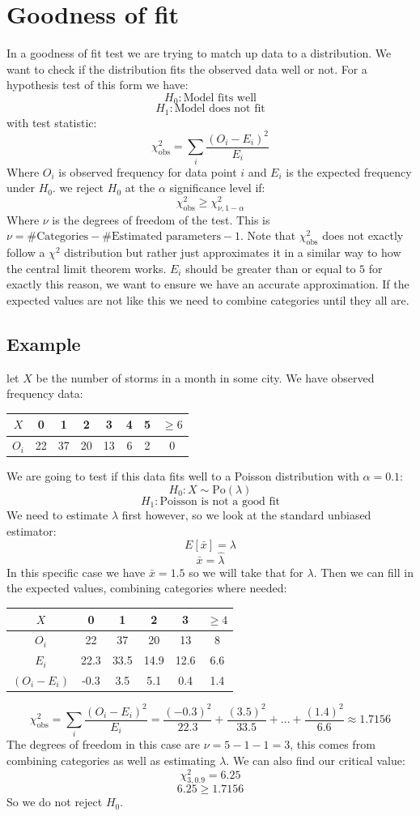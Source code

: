 \documentclass[12pt]{article}
\newcommand{\chisq}{\chi^2_{\text{obs}}}
\begin{document}
\section{Goodness of fit}
In a goodness of fit test we are trying to match up data to a distribution. We want to check if the distribution fits the observed data well or not. For a hypothesis test of this form we have:
\[H_0: \text{Model fits well}\]
\[H_1: \text{Model does not fit}\]
with test statistic:
\[\chisq=\sum_i\frac{(O_i-E_i)^2}{E_i}\]
Where \(O_i\) is observed frequency for data point \(i\) and \(E_i\) is the expected frequency under \(H_0\). we reject \(H_0\) at the \(\alpha\) significance level if:
\[\chisq\geq \chi^2_{\nu,1-\alpha}\]
Where \(\nu\) is the degrees of freedom of the test. This is \(\nu=\#\text{Categories}-\#\text{Estimated parameters}-1\). Note that \(\chisq\) does not exactly follow a \(\chi^2\) distribution but rather just approximates it in a similar way to how the central limit theorem works. \(E_i\) should be greater than or equal to \(5\) for exactly this reason, we want to ensure we have an accurate approximation. If the expected values are not like this we need to combine categories until they all are.
\subsection*{Example}
let \(X\) be the number of storms in a month in some city. We have observed frequency data:
\begin{table}[H]
    \centering
    \begin{tabular}{c|c|c|c|c|c|c|c}
        \(X\) & 0 & 1 & 2 & 3 & 4 & 5 & \(\geq 6\) \\ \hline
        \(O_i\) & 22 & 37 & 20 & 13 & 6 & 2 & 0
    \end{tabular}
\end{table}
We are going to test if this data fits well to a Poisson distribution with \(\alpha=0.1\):
\[H_0: X\sim \text{Po}(\lambda)\]
\[H_1: \text{Poisson is not a good fit}\]
We need to estimate \(\lambda\) first however, so we look at the standard unbiased estimator:
\[E[\bar{x}]=\lambda\]
\[\bar{x}=\hat{\lambda}\]
In this specific case we have \(\bar{x}=1.5\) so we will take that for \(\lambda\). Then we can fill in the expected values, combining categories where needed:
\begin{table}[H]
    \centering
    \begin{tabular}{c|c|c|c|c|c}
        \(X\) & 0 & 1 & 2 & 3 & \(\geq4\) \\ \hline
        \(O_i\) & 22 & 37 & 20 & 13 & 8 \\
        \(E_i\) & 22.3 & 33.5 & 14.9 & 12.6 & 6.6 \\
        \((O_i-E_i)\) & -0.3 & 3.5 & 5.1 & 0.4 & 1.4 
    \end{tabular}
\end{table}
\[\chisq =\sum_i\frac{(O_i-E_i)^2}{E_i}=\frac{(-0.3)^2}{22.3}+\frac{(3.5)^2}{33.5}+\dots+\frac{(1.4)^2}{6.6}\approx 1.7156\]
The degrees of freedom in this case are \(\nu=5-1-1=3\), this comes from combining categories as well as estimating \(\lambda\). We can also find our critical value:
\[\chi^2_{3,0.9}=6.25\]
\[6.25\geq 1.7156\]
So we do not reject \(H_0\).
\end{document}
